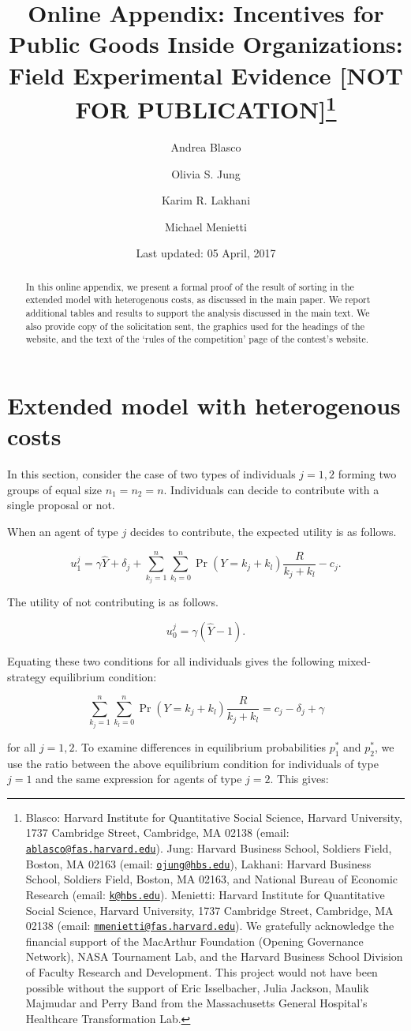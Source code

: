\documentclass[12pt, titlepage]{article}
\institute{}
\title{Online Appendix: Incentives for Public Goods Inside Organizations: Field
Experimental Evidence {[}NOT FOR PUBLICATION{]}\thanks{Blasco: Harvard Institute for Quantitative Social Science, Harvard
University, 1737 Cambridge Street, Cambridge, MA 02138 (email:
\href{mailto:ablasco@fas.harvard.edu}{\nolinkurl{ablasco@fas.harvard.edu}}).
Jung: Harvard Business School, Soldiers Field, Boston, MA 02163 (email:
\href{mailto:ojung@hbs.edu}{\nolinkurl{ojung@hbs.edu}}), Lakhani:
Harvard Business School, Soldiers Field, Boston, MA 02163, and National
Bureau of Economic Research (email:
\href{mailto:k@hbs.edu}{\nolinkurl{k@hbs.edu}}). Menietti: Harvard
Institute for Quantitative Social Science, Harvard University, 1737
Cambridge Street, Cambridge, MA 02138 (email:
\href{mailto:mmenietti@fas.harvard.edu}{\nolinkurl{mmenietti@fas.harvard.edu}}).
We gratefully acknowledge the financial support of the MacArthur
Foundation (Opening Governance Network), NASA Tournament Lab, and the
Harvard Business School Division of Faculty Research and Development.
This project would not have been possible without the support of Eric
Isselbacher, Julia Jackson, Maulik Majmudar and Perry Band from the
Massachusetts General Hospital's Healthcare Transformation Lab.}}
\author{Andrea Blasco \and Olivia S. Jung \and Karim R. Lakhani \and Michael Menietti}
\date{Last updated: 05 April, 2017}
\begin{document}
\maketitle
\begin{abstract}
In this online appendix, we present a formal proof of the result of
sorting in the extended model with heterogenous costs, as discussed in
the main paper. We report additional tables and results to support the
analysis discussed in the main text. We also provide copy of the
solicitation sent, the graphics used for the headings of the website,
and the text of the `rules of the competition' page of the contest's
website.


\end{abstract}


\clearpage

\section{Extended model with heterogenous
costs}\label{extended-model-with-heterogenous-costs}

In this section, consider the case of two types of individuals \(j=1,2\)
forming two groups of equal size \(n_1=n_2=n\). Individuals can decide
to contribute with a single proposal or not.

When an agent of type \(j\) decides to contribute, the expected utility
is as follows.

\begin{equation}
 u_1^j = \gamma \hat Y + \delta_j + \sum_{k_j=1}^n \sum_{k_l=0}^n \Pr(Y=k_j+k_l) \frac{R}{k_j+k_l} - c_j.
\end{equation}

The utility of not contributing is as follows.

\begin{equation}
 u_0^j = \gamma (\hat Y - 1).
\end{equation}

Equating these two conditions for all individuals gives the following
mixed-strategy equilibrium condition:

\begin{equation}
\sum_{k_j=1}^n \sum_{k_l=0}^n \Pr(Y=k_j+k_l) \frac{R}{k_j+k_l} = c_j -\delta_j + \gamma
\end{equation}

for all \(j=1,2\). To examine differences in equilibrium probabilities
\(p_1^*\) and \(p_2^*\), we use the ratio between the above equilibrium
condition for individuals of type \(j=1\) and the same expression for
agents of type \(j=2\). This gives:
\end{document}
